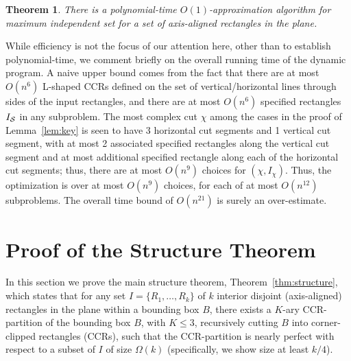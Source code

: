 \documentclass{article}
\newtheorem{theorem}{Theorem}[section]
\begin{document}
\begin{theorem}\label{thm:main}
  There is a polynomial-time $O(1)$-approximation  %
  algorithm for maximum
  independent set for a set of axis-aligned rectangles in the plane.
\end{theorem}

 While efficiency is not the focus of our
attention here, other than to establish polynomial-time, we comment
briefly on the overall running time of the dynamic program. A naive
upper bound comes from the fact that there are at most $O(n^{6})$
L-shaped CCRs defined on the set of vertical/horizontal lines through sides of
the input rectangles, and there are at most $O(n^{6})$ specified rectangles $I_{\cal S}$ in any subproblem.
The most complex cut $\chi$ among the cases in the proof of Lemma~\ref{lem:key} is seen to have 3 horizontal cut segments and 1 vertical cut segment, with at most 2 associated specified rectangles along the vertical cut segment and at most additional specified rectangle along each of the horizontal cut segments; thus, there are at most $O(n^{9})$ choices for $(\chi,I_\chi)$. 
Thus, the
optimization is over at most $O(n^{9})$ choices, for each of at most $O(n^{12})$ subproblems.
The overall time bound of $O(n^{21})$ is surely an over-estimate.

\section{Proof of the Structure Theorem}
\label{sec:proof}

In this section we prove the main structure theorem,
Theorem~\ref{thm:structure}, which states that for any set
$I=\{R_1,\ldots,R_k\}$ of $k$ interior disjoint (axis-aligned)
rectangles in the plane within a bounding box $B$, there exists a
$K$-ary CCR-partition of the bounding box $B$, with $K\leq 3$,
recursively cutting $B$ into corner-clipped rectangles (CCRs), such
that the CCR-partition is nearly perfect with respect to a subset of
$I$ of size $\Omega(k)$ (specifically, we show size at least $k/4$).
\end{document}
